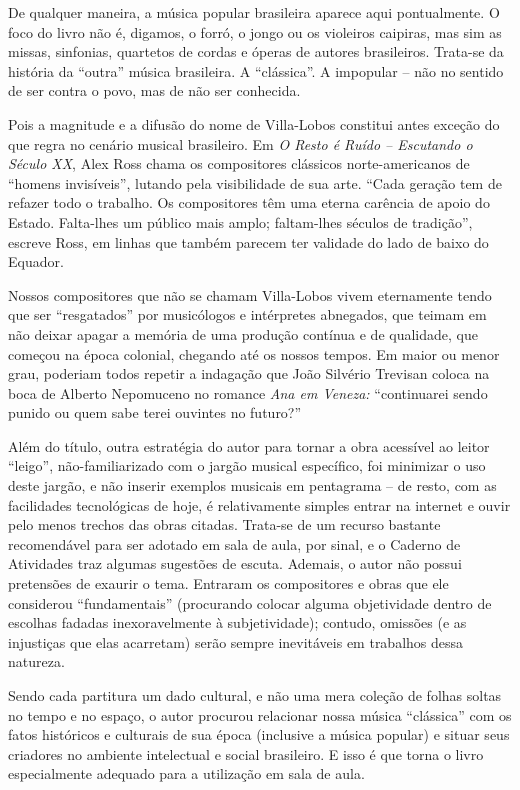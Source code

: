 \documentclass[11pt]{extarticle}
\begin{document}
De qualquer maneira, a música popular brasileira aparece aqui
pontualmente. O foco do livro não é, digamos, o forró, o jongo ou os
violeiros caipiras, mas sim as missas, sinfonias, quartetos de cordas e
óperas de autores brasileiros. Trata-se da história da ``outra'' música
brasileira. A ``clássica''. A impopular -- não no sentido de ser contra
o povo, mas de não ser conhecida.

Pois a magnitude e a difusão do nome de Villa-Lobos constitui antes
exceção do que regra no cenário musical brasileiro. Em \emph{O Resto é
Ruído -- Escutando o Século XX}, Alex Ross chama os compositores
clássicos norte-americanos de ``homens invisíveis'', lutando pela
visibilidade de sua arte. ``Cada geração tem de refazer todo o trabalho.
Os compositores têm uma eterna carência de apoio do Estado. Falta-lhes
um público mais amplo; faltam-lhes séculos de tradição'', escreve Ross,
em linhas que também parecem ter validade do lado de baixo do Equador.

Nossos compositores que não se chamam Villa-Lobos vivem eternamente
tendo que ser ``resgatados'' por musicólogos e intérpretes abnegados,
que teimam em não deixar apagar a memória de uma produção contínua e de
qualidade, que começou na época colonial, chegando até os nossos tempos.
Em maior ou menor grau, poderiam todos repetir a indagação que João
Silvério Trevisan coloca na boca de Alberto Nepomuceno no romance
\emph{Ana em Veneza:} ``continuarei sendo punido ou quem sabe terei
ouvintes no futuro?''

Além do título, outra estratégia do autor para tornar a obra acessível
ao leitor ``leigo'', não-familiarizado com o jargão musical específico,
foi minimizar o uso deste jargão, e não inserir exemplos musicais em
pentagrama -- de resto, com as facilidades tecnológicas de hoje, é
relativamente simples entrar na internet e ouvir pelo menos trechos das
obras citadas. Trata-se de um recurso bastante recomendável para ser
adotado em sala de aula, por sinal, e o Caderno de Atividades traz
algumas sugestões de escuta. Ademais, o autor não possui pretensões de
exaurir o tema. Entraram os compositores e obras que ele considerou
``fundamentais'' (procurando colocar alguma objetividade dentro de
escolhas fadadas inexoravelmente à subjetividade); contudo, omissões (e
as injustiças que elas acarretam) serão sempre inevitáveis em trabalhos
dessa natureza.

Sendo cada partitura um dado cultural, e não uma mera coleção de folhas
soltas no tempo e no espaço, o autor procurou relacionar nossa música
``clássica'' com os fatos históricos e culturais de sua época (inclusive
a música popular) e situar seus criadores no ambiente intelectual e
social brasileiro. E isso é que torna o livro especialmente adequado
para a utilização em sala de aula.
\end{document}

